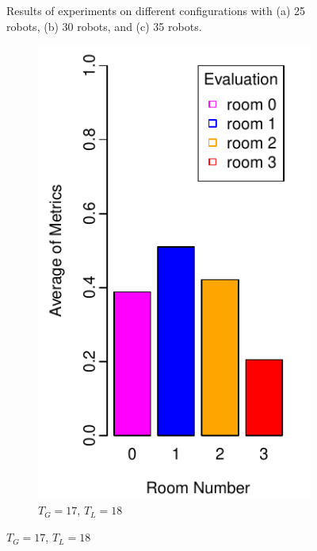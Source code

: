 \documentclass{llncs}
\begin{document}
\begin{figure}[h!]
\begin{subfigure}[b]{0.67\textwidth}
                \label{fig:exp1}
        \end{subfigure}
        
	\caption{Results of experiments on different configurations with (a) 25 robots, (b) 30 robots, and (c) 35 robots.}\label{fig:plots456}
	\end{figure}
	
	\begin{figure}[h!]
        \centering
        \begin{subfigure}[b]{0.25\textwidth}
                \includegraphics[width=\textwidth]{PLOT/EVAL/eval7}
                \caption{$T_G = 17$, $T_L = 18$}

\end{subfigure}
\end{figure}
\end{document}
